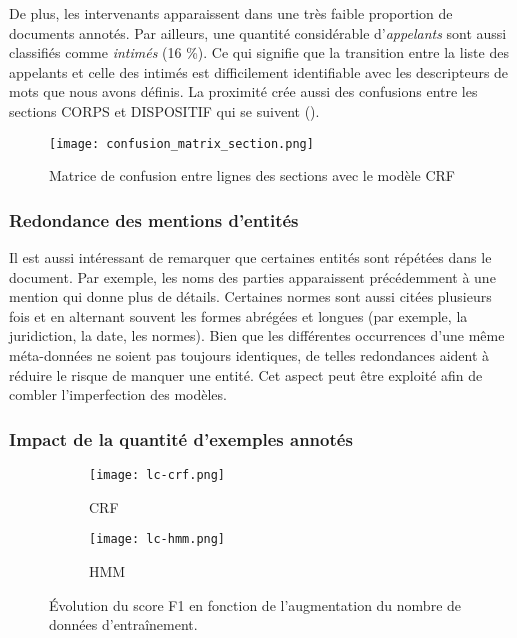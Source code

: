  De plus, les intervenants apparaissent dans une très faible proportion de documents annotés.  Par ailleurs, une quantité considérable d'\textit{appelants} sont aussi classifiés comme \textit{intimés} (16 \%).  Ce qui signifie que la transition entre la liste des appelants et celle des intimés est difficilement identifiable avec les descripteurs de mots que nous avons définis. La proximité crée aussi des confusions entre les sections CORPS et DISPOSITIF qui se suivent (). 

\begin{figure}[!htb]
	\centering
	\texttt{[image: confusion\_matrix\_section.png]}
	\caption{Matrice de confusion entre lignes des sections avec le modèle CRF}
	\label{fig:structuration:matrice-confusion-section}
\end{figure}

\subsubsection{Redondance des mentions d'entités}
Il est aussi intéressant de remarquer que certaines entités sont répétées dans le document. Par exemple, les noms des parties apparaissent précédemment à une mention qui donne plus de détails. Certaines normes sont aussi citées plusieurs fois et en alternant souvent les formes abrégées et longues (par exemple, la juridiction, la date, les normes). Bien que les différentes occurrences d'une même méta-données ne soient pas toujours identiques, de telles redondances aident à réduire le risque de manquer une entité. Cet aspect peut être exploité afin de combler l'imperfection des modèles.


\subsubsection{Impact de la quantité d'exemples annotés}

\begin{figure}[!htb]
	\centering
	\begin{subfigure}[ht]{0.95\textwidth}
		\centering
		\texttt{[image: lc-crf.png]} 
		\caption{CRF} \label{fig:structuration:learning-curves-crf}
	\end{subfigure} 
	
	\begin{subfigure}[ht]{0.95\textwidth}
		\centering
		\texttt{[image: lc-hmm.png]}
		\caption{HMM} \label{fig:structuration:learning-curves-hmm}
	\end{subfigure}
	\caption{Évolution du score F1 en fonction de l'augmentation du nombre de données d'entraînement.} \label{fig:structuration:learning-curves}
\end{figure}

